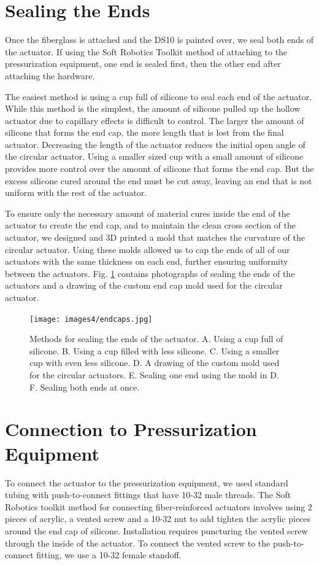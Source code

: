 \clearpage
\section{Sealing the Ends}
Once the fiberglass is attached and the DS10 is painted over, we seal both ends of the actuator. If using the Soft Robotics Toolkit method of attaching to the pressurization equipment, one end is sealed first, then the other end after attaching the hardware. 

The easiest method is using a cup full of silicone to seal each end of the actuator. While this method is the simplest, the amount of silicone pulled up the hollow actuator due to capillary effects is difficult to control. The larger the amount of silicone that forms the end cap, the more length that is lost from the final actuator. Decreasing the length of the actuator reduces the initial open angle of the circular actuator. Using a smaller sized cup with a small amount of silicone provides more control over the amount of silicone that forms the end cap. But the excess silicone cured around the end must be cut away, leaving an end that is not uniform with the rest of the actuator. 

To ensure only the necessary amount of material cures inside the end of the actuator to create the end cap, and to maintain the clean cross section of the actuator, we designed and 3D printed a mold that matches the curvature of the circular actuator. Using these molds allowed us to cap the ends of all of our actuators with the same thickness on each end, further ensuring uniformity between the actuators. Fig. \ref{fig:endcaps} contains photographs of sealing the ends of the actuators and a drawing of the custom end cap mold used for the circular actuator. 

\begin{figure}[h!]
    \centering
    \texttt{[image: images4/endcaps.jpg]}
    \caption{Methods for sealing the ends of the actuator. A. Using a cup full of silicone. B. Using a cup filled with less silicone. C. Using a smaller cup with even less silicone. D. A drawing of the custom mold used for the circular actuators. E. Sealing one end using the mold in D. F. Sealing both ends at once. }
    \label{fig:endcaps}
\end{figure}

\clearpage
\section{Connection to Pressurization Equipment}
To connect the actuator to the pressurization equipment, we used standard tubing with push-to-connect fittings that have 10-32 male threads. The Soft Robotics toolkit method for connecting fiber-reinforced actuators involves using 2 pieces of acrylic, a vented screw and a 10-32 nut to add tighten the acrylic pieces around the end cap of silicone. Installation requires puncturing the vented screw through the inside of the actuator. To connect the vented screw to the push-to-connect fitting, we use a 10-32 female standoff. 

